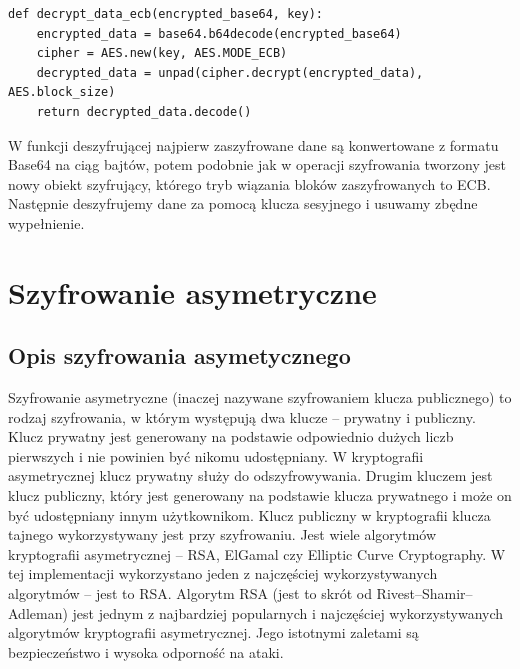 \begin{lstlisting}
def decrypt_data_ecb(encrypted_base64, key):
    encrypted_data = base64.b64decode(encrypted_base64)
    cipher = AES.new(key, AES.MODE_ECB)
    decrypted_data = unpad(cipher.decrypt(encrypted_data), AES.block_size)
    return decrypted_data.decode()
\end{lstlisting}
W funkcji deszyfrującej najpierw zaszyfrowane dane są konwertowane z formatu Base64 na ciąg bajtów, potem podobnie jak w operacji szyfrowania tworzony jest nowy obiekt szyfrujący, którego tryb wiązania bloków zaszyfrowanych to ECB. Następnie deszyfrujemy dane za pomocą klucza sesyjnego i usuwamy zbędne wypełnienie.

\section{Szyfrowanie asymetryczne}

\subsection{Opis szyfrowania asymetycznego}
Szyfrowanie asymetryczne (inaczej nazywane szyfrowaniem klucza publicznego) to rodzaj szyfrowania, w którym występują dwa klucze – prywatny i publiczny. Klucz prywatny jest generowany na podstawie odpowiednio dużych liczb pierwszych i nie powinien być nikomu udostępniany. W kryptografii asymetrycznej klucz prywatny służy do odszyfrowywania. Drugim kluczem jest klucz publiczny, który jest generowany na podstawie klucza prywatnego i może on być udostępniany innym użytkownikom. Klucz publiczny w kryptografii klucza tajnego wykorzystywany jest przy szyfrowaniu. Jest wiele algorytmów kryptografii asymetrycznej – RSA, ElGamal czy Elliptic Curve Cryptography. W tej implementacji wykorzystano jeden z najczęściej wykorzystywanych algorytmów – jest to RSA. Algorytm RSA (jest to skrót od Rivest–Shamir–Adleman) jest jednym z najbardziej popularnych i najczęściej wykorzystywanych algorytmów kryptografii asymetrycznej. Jego istotnymi zaletami są bezpieczeństwo i wysoka odporność na ataki.

